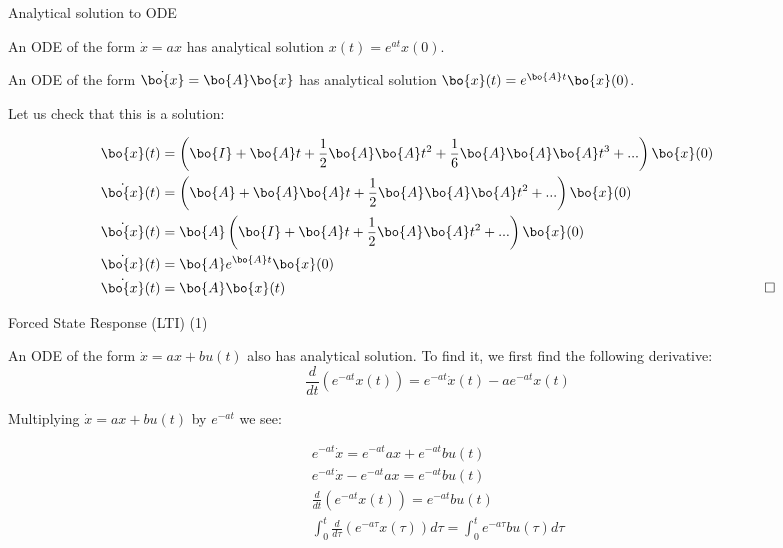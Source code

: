 \documentclass{beamer}
\begin{document}
\begin{frame}{Analytical solution to ODE}
	\begin{flushleft}
		
		An ODE of the form $\dot x = a x$ has analytical solution $x(t) = e^{at} x(0)$.
		
		\bigskip
		
		An ODE of the form $\dot{\bo{x}} = \bo{A}  \bo{x}$ has analytical solution $\bo{x}(t) = e^{\bo{A}t}  \bo{x}(0)$.
		
		\bigskip
		
		Let us check that this is a solution:
		
		\begin{align}
			\bo{x}(t) &= \left( \bo{I}+\bo{A}t+\frac{1}{2} \bo{A}\bo{A}t^2
			+\frac{1}{6} \bo{A}\bo{A}\bo{A}t^3 + ... \right)  \bo{x}(0) &
			\\
			\dot{\bo{x}}(t) &= \left( \bo{A}+\bo{A}\bo{A}t
			+\frac{1}{2}\bo{A}\bo{A}\bo{A}t^2 + ... \right)  \bo{x}(0) 	&		
			\\
			\dot{\bo{x}}(t) &= \bo{A} \left(\bo{I} +\bo{A}t
			+\frac{1}{2}\bo{A}\bo{A}t^2 + ... \right)  \bo{x}(0) 	&		
			\\
			\dot{\bo{x}}(t) &= \bo{A} e^{\bo{A}t}  \bo{x}(0) 	&		 			
			\\
			\dot{\bo{x}}(t) &= \bo{A} \bo{x}(t)  &\ \ \qed
		\end{align}
		
		
		
	\end{flushleft}
\end{frame}



\begin{frame}{Forced State Response (LTI) (1)}
	\begin{flushleft}
		
		An ODE of the form $\dot x = a x + bu(t)$ also has analytical solution. To find it, we first find the following derivative:
		\begin{equation}
			\frac{d}{dt} \left( e^{-at} x(t) \right) = e^{-at} \dot x(t) - a e^{-at} x(t)
		\end{equation}
		
		Multiplying $\dot x = a x + bu(t)$ by $e^{-at}$ we see:
		
		\begin{align}
			e^{-at} \dot x = e^{-at} a x + e^{-at} bu(t)
			\\
			e^{-at} \dot x -  e^{-at} a x= e^{-at} bu(t)
			\\
			\frac{d}{dt} \left( e^{-at} x(t) \right) = e^{-at} bu(t)
			\\
			\int_{0}^{t} \frac{d}{d\tau} \left( e^{-a\tau} x(\tau) \right) d\tau = 	\int_{0}^{t}  e^{-a\tau} bu(\tau) d\tau
		\end{align}
		
		
		
	\end{flushleft}
\end{frame}
\end{document}
